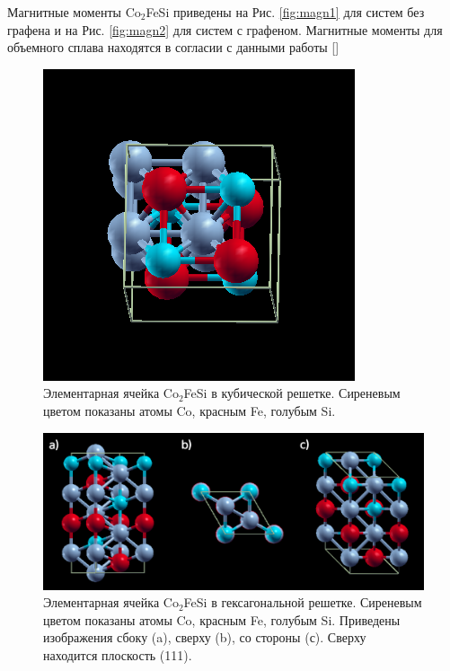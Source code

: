 \documentclass[]{article}
\begin{document}
Магнитные моменты Co$_2$FeSi приведены на Рис. \ref{fig:magn1} для систем без графена и на Рис. \ref{fig:magn2} для систем с графеном. Магнитные моменты для объемного сплава находятся в согласии с данными работы []

\begin{figure}[h]
    \centering
    \includegraphics[scale=0.5]{images/co2fesi-cell-2.png}
    \caption{Элементарная ячейка Co$_2$FeSi в кубической решетке. Сиреневым цветом показаны атомы Co, красным Fe, голубым Si.}
    \label{fig:cubic-cell}
\end{figure}

\begin{figure}[h]
    \centering
    \includegraphics[scale=0.6]{images/hex-cell0.png}
    \caption{Элементарная ячейка Co$_2$FeSi в гексагональной решетке. Сиреневым цветом показаны атомы Co, красным Fe, голубым Si. Приведены изображения сбоку (a), сверху (b), со стороны (с). Сверху находится плоскость (111). }
    \label{fig:hex-cell}
\end{figure}
\end{document}
